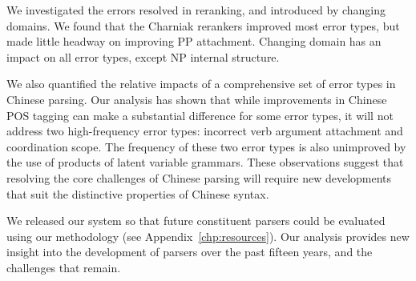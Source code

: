 We investigated the errors resolved in reranking, and introduced by changing
domains. We found that the Charniak rerankers improved most error types, but
made little headway on improving PP attachment.  Changing domain has an impact
on all error types, except NP internal structure.

We also quantified the relative impacts of a comprehensive set of error types
in Chinese parsing.  Our analysis has shown that while improvements in
Chinese POS tagging can make a substantial difference for some error types,
it will not address two high-frequency error types: incorrect verb argument
attachment and coordination scope.  The frequency of these two error types is
also unimproved by the use of products of latent variable grammars.  These
observations suggest that resolving the core challenges of Chinese parsing
will require new developments that suit the distinctive properties of Chinese
syntax.

We released our system so that future constituent parsers could be evaluated using our methodology (see Appendix~\ref{chp:resources}).
Our analysis provides new insight into the development of parsers over the past fifteen years, and the challenges that remain.


